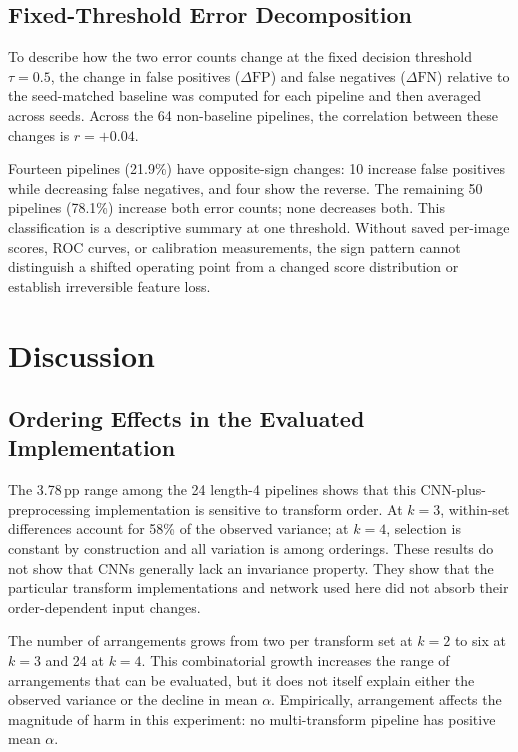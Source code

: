 \documentclass[preprint,review,12pt]{elsarticle}
\begin{document}
\subsection{Fixed-Threshold Error Decomposition}
\label{subsec:error}

To describe how the two error counts change at the fixed decision threshold $\tau = 0.5$, the change in false positives ($\Delta\text{FP}$) and false negatives ($\Delta\text{FN}$) relative to the seed-matched baseline was computed for each pipeline and then averaged across seeds. Across the 64 non-baseline pipelines, the correlation between these changes is $r = +0.04$.

Fourteen pipelines (21.9\%) have opposite-sign changes: 10 increase false positives while decreasing false negatives, and four show the reverse. The remaining 50 pipelines (78.1\%) increase both error counts; none decreases both. This classification is a descriptive summary at one threshold. Without saved per-image scores, ROC curves, or calibration measurements, the sign pattern cannot distinguish a shifted operating point from a changed score distribution or establish irreversible feature loss.

\section{Discussion}
\label{sec:discussion}

\subsection{Ordering Effects in the Evaluated Implementation}

The 3.78\,pp range among the 24 length-4 pipelines shows that this CNN-plus-preprocessing implementation is sensitive to transform order. At $k=3$, within-set differences account for 58\% of the observed variance; at $k=4$, selection is constant by construction and all variation is among orderings. These results do not show that CNNs generally lack an invariance property. They show that the particular transform implementations and network used here did not absorb their order-dependent input changes.

The number of arrangements grows from two per transform set at $k=2$ to six at $k=3$ and 24 at $k=4$. This combinatorial growth increases the range of arrangements that can be evaluated, but it does not itself explain either the observed variance or the decline in mean $\alpha$. Empirically, arrangement affects the magnitude of harm in this experiment: no multi-transform pipeline has positive mean $\alpha$.
\end{document}
